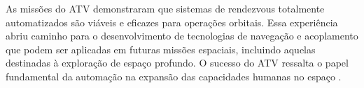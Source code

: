 As missões do ATV demonstraram que sistemas de rendezvous totalmente automatizados são viáveis e eficazes para operações orbitais. Essa experiência abriu caminho para o desenvolvimento de tecnologias de navegação e acoplamento que podem ser aplicadas em futuras missões espaciais, incluindo aquelas destinadas à exploração de espaço profundo. O sucesso do ATV ressalta o papel fundamental da automação na expansão das capacidades humanas no espaço \cite{esaATVRendezvous}.















